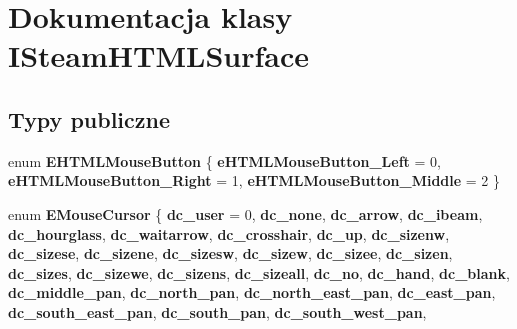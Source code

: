 \hypertarget{class_i_steam_h_t_m_l_surface}{}\section{Dokumentacja klasy I\+Steam\+H\+T\+M\+L\+Surface}
\label{class_i_steam_h_t_m_l_surface}
\subsection*{Typy publiczne}
\begin{DoxyCompactItemize}
\item 
\mbox{\label{class_i_steam_h_t_m_l_surface_a116b20c2ab69e90338abc523de0a09fd}} 
enum {\bfseries E\+H\+T\+M\+L\+Mouse\+Button} \{ {\bfseries e\+H\+T\+M\+L\+Mouse\+Button\+\_\+\+Left} = 0, 
{\bfseries e\+H\+T\+M\+L\+Mouse\+Button\+\_\+\+Right} = 1, 
{\bfseries e\+H\+T\+M\+L\+Mouse\+Button\+\_\+\+Middle} = 2
 \}
\item 
\mbox{\label{class_i_steam_h_t_m_l_surface_a4a9ceb3013cded62abe82b1b89749db6}} 
enum {\bfseries E\+Mouse\+Cursor} \{ \newline
{\bfseries dc\+\_\+user} = 0, 
{\bfseries dc\+\_\+none}, 
{\bfseries dc\+\_\+arrow}, 
{\bfseries dc\+\_\+ibeam}, 
\newline
{\bfseries dc\+\_\+hourglass}, 
{\bfseries dc\+\_\+waitarrow}, 
{\bfseries dc\+\_\+crosshair}, 
{\bfseries dc\+\_\+up}, 
\newline
{\bfseries dc\+\_\+sizenw}, 
{\bfseries dc\+\_\+sizese}, 
{\bfseries dc\+\_\+sizene}, 
{\bfseries dc\+\_\+sizesw}, 
\newline
{\bfseries dc\+\_\+sizew}, 
{\bfseries dc\+\_\+sizee}, 
{\bfseries dc\+\_\+sizen}, 
{\bfseries dc\+\_\+sizes}, 
\newline
{\bfseries dc\+\_\+sizewe}, 
{\bfseries dc\+\_\+sizens}, 
{\bfseries dc\+\_\+sizeall}, 
{\bfseries dc\+\_\+no}, 
\newline
{\bfseries dc\+\_\+hand}, 
{\bfseries dc\+\_\+blank}, 
{\bfseries dc\+\_\+middle\+\_\+pan}, 
{\bfseries dc\+\_\+north\+\_\+pan}, 
\newline
{\bfseries dc\+\_\+north\+\_\+east\+\_\+pan}, 
{\bfseries dc\+\_\+east\+\_\+pan}, 
{\bfseries dc\+\_\+south\+\_\+east\+\_\+pan}, 
{\bfseries dc\+\_\+south\+\_\+pan}, 
\newline
{\bfseries dc\+\_\+south\+\_\+west\+\_\+pan}, 

\end{DoxyCompactItemize}
